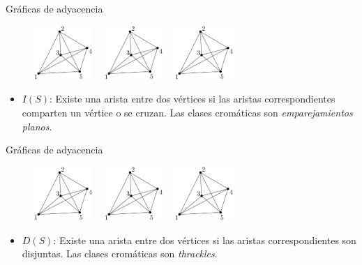\begin{frame}{Gráficas de adyacencia}
\begin{figure}
	\centering
	\includegraphics[width=0.2\textwidth]{images/K5}%
	~\vrule
	\includegraphics[width=0.2\textwidth]{images/K5}%
	~\vrule
	\includegraphics[width=0.2\textwidth]{images/K5}%
\end{figure}

\begin{itemize}
\item $I(S)$: Existe una arista entre dos vértices si las aristas correspondientes comparten un vértice o se cruzan. Las clases cromáticas son \emph{emparejamientos planos}.

\end{itemize}
\end{frame}
\begin{frame}{Gráficas de adyacencia}
\begin{figure}
	\centering
	\includegraphics[width=0.2\textwidth]{images/K5}%
	~\vrule
	\includegraphics[width=0.2\textwidth]{images/K5}%
	~\vrule
	\includegraphics[width=0.2\textwidth]{images/K5}%
\end{figure}

\begin{itemize}
\item $D(S)$: Existe una arista entre dos vértices si las aristas correspondientes son disjuntas. Las clases cromáticas son \emph{thrackles}.
\end{itemize}
\end{frame}

